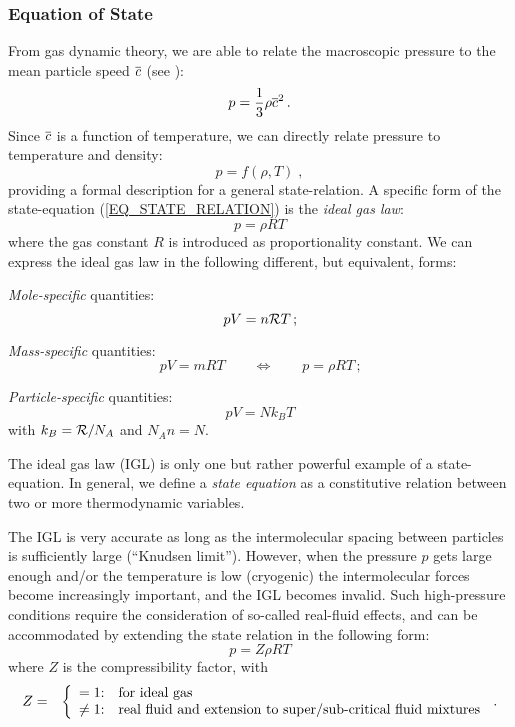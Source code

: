 \subsubsection{Equation of State}
From gas dynamic theory, we are able to relate the macroscopic pressure to the mean particle speed ${\overline{c}}$ (see \cite{VINCENTI_KRUGER_BOOK1965}):
\begin{equation}
  p = {\frac{1}{3}}\rho{\overline{c}}^2 \, \text{.}
\end{equation}
Since ${\overline{c}}$ is a function of temperature, we can directly relate pressure to temperature and density:
\begin{equation}
  \label{EQ_STATE_RELATION}
  p = f(\rho,T)\;,
\end{equation}
providing a formal description for a general state-relation. A specific form of the state-equation (\ref{EQ_STATE_RELATION}) is the {\it ideal gas law}:
\begin{equation}
  p = \rho R  T
\end{equation}
where the gas constant $R$ is introduced as proportionality constant. We can express the ideal gas law in the following different, but equivalent, forms:
\begin{itemizePacked}
  \item {\it Mole-specific} quantities:
  \[
   p V=  n {\cal{R}} T \, \text{;}
  \]
  \item {\it Mass-specific} quantities:
  \[
   p V= m R T \qquad \Leftrightarrow\qquad p = \rho R T \, \text{;}
  \]
  \item {\it Particle-specific} quantities:
  \[
   p V= N k_B T
  \]
  with $k_B = {\cal{R}}/N_A$ and $N_An=N.$
\end{itemizePacked}
The ideal gas law (IGL) is only one but rather powerful example of a state-equation. In general, we define a {\it state equation} as a constitutive relation between two or more thermodynamic variables. 

The IGL is very accurate as long as the intermolecular spacing between particles is sufficiently large (``Knudsen limit''). However, when the pressure $p$ gets large enough and/or the temperature is low (cryogenic) the intermolecular forces become increasingly important, and the IGL becomes invalid. Such high-pressure conditions require the consideration of so-called real-fluid effects, and can be accommodated by extending the state relation in the following form:
\begin{equation}
  p = Z \rho R T
\end{equation}
where $Z$ is the compressibility factor, with
\begin{eqnarray}
  Z &=&\left\{ 
         \begin{array}{r@{:\quad}l}
          = 1& {\text{for ideal gas}}\\
          \ne 1& {\text{real fluid and extension to super/sub-critical fluid mixtures}}
         \end{array}
         \right. \, \text{.}
\end{eqnarray}

